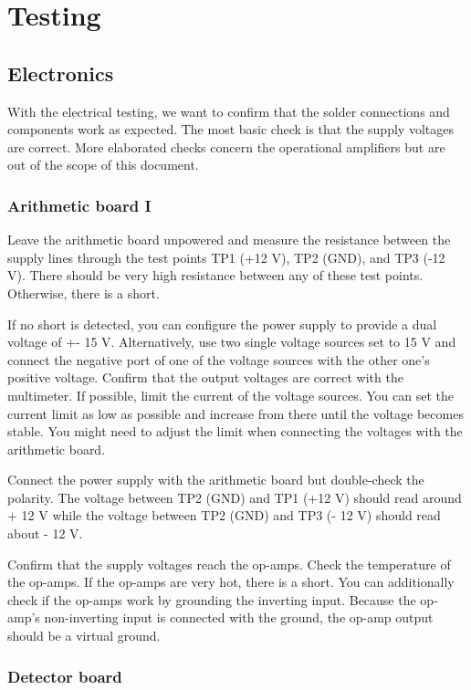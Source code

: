 \section{Testing}

\subsection{Electronics}

With the electrical testing, we want to confirm that the solder connections and components work as expected.
The most basic check is that the supply voltages are correct.
More elaborated checks concern the operational amplifiers but are out of the scope of this document.

\subsubsection{Arithmetic board I}

Leave the arithmetic board unpowered and measure the resistance between the supply lines through the test points TP1 (+12 V), TP2 (GND), and TP3 (-12 V).
There should be very high resistance between any of these test points.
Otherwise, there is a short.

If no short is detected, you can configure the power supply to provide a dual voltage of +- 15 V.
Alternatively, use two single voltage sources set to 15 V and connect the negative port of one of the voltage sources with the other one's positive voltage.
Confirm that the output voltages are correct with the multimeter. If possible, limit the current of the voltage sources.
You can set the current limit as low as possible and increase from there until the voltage becomes stable.
You might need to adjust the limit when connecting the voltages with the arithmetic board.

Connect the power supply with the arithmetic board but double-check the polarity.
The voltage between TP2 (GND) and TP1 (+12 V) should read around + 12 V while the voltage between TP2 (GND) and TP3 (- 12 V) should read about - 12 V.

Confirm that the supply voltages reach the op-amps.
Check the temperature of the op-amps.
If the op-amps are very hot, there is a short.
You can additionally check if the op-amps work by grounding the inverting input.
Because the op-amp's non-inverting input is connected with the ground, the op-amp output should be a virtual ground.

\subsubsection{Detector board}

